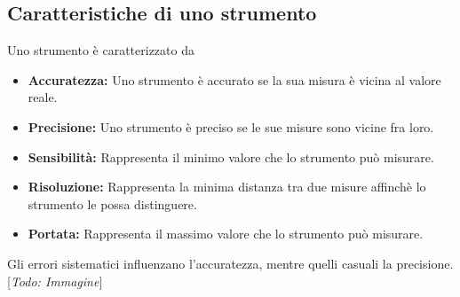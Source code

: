 \documentclass{article}
\begin{document}
\subsection{Caratteristiche di uno strumento}
Uno strumento è caratterizzato da
\begin{itemize}
    \item \textbf{Accuratezza:}
    Uno strumento è accurato se la sua misura è vicina al valore reale.
    \item \textbf{Precisione:}
    Uno strumento è preciso se le sue misure sono vicine fra loro.
    \item \textbf{Sensibilità:}
    Rappresenta il minimo valore che lo strumento può misurare.
    \item \textbf{Risoluzione:}
    Rappresenta la minima distanza tra due misure affinchè lo strumento le possa distinguere.
    \item \textbf{Portata:}
    Rappresenta il massimo valore che lo strumento può misurare.
\end{itemize}
Gli errori sistematici influenzano l'accuratezza, mentre quelli casuali la precisione. [\textit{Todo: Immagine}]
\end{document}
